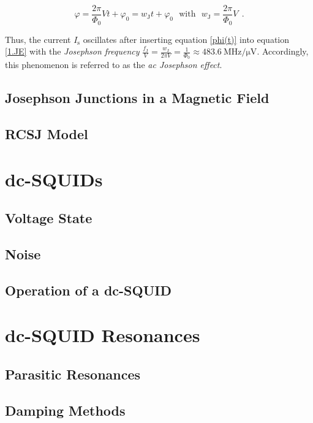 \begin{equation}
\label{phi(t)}
\varphi = \frac{2\pi}{\Phi_0}Vt + \varphi_0 = w_\mathrm{J}t + \varphi_0 \ \ \ \mathrm{with} \ \ \ w_\mathrm{J} = \frac{2\pi}{\Phi_0}V \ \ .
\end{equation}

Thus, the current $I_\mathrm{s}$ oscillates after inserting equation \eqref{phi(t)} into equation \eqref{1.JE} with the \textit{Josephson frequency} $\frac{f_\mathrm{J}}{V} = \frac{w_\mathrm{J}}{2\pi V} = \frac{1}{\Phi_0} \approx \SI{483.6}{\MHz\per\uV}$. Accordingly, this phenomenon is referred to as the \textit{ac Josephson effect}.



\subsection{Josephson Junctions in a Magnetic Field}

\Blindtext

\subsection{RCSJ Model}

\section{dc-SQUIDs}

\blindtext[3]

\subsection{Voltage State}

\subsection{Noise}

\subsection{Operation of a dc-SQUID}


\section{dc-SQUID Resonances}

\subsection{Parasitic Resonances}

\subsection{Damping Methods}


